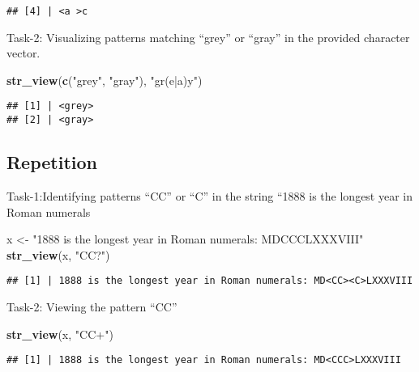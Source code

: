 \documentclass[
]{article}
\newenvironment{Shaded}{\begin{snugshade}}{\end{snugshade}}
\newcommand{\FunctionTok}[1]{\textcolor[rgb]{0.13,0.29,0.53}{\textbf{#1}}}
\newcommand{\NormalTok}[1]{#1}
\newcommand{\OtherTok}[1]{\textcolor[rgb]{0.56,0.35,0.01}{#1}}
\newcommand{\StringTok}[1]{\textcolor[rgb]{0.31,0.60,0.02}{#1}}
\begin{document}
\begin{verbatim}
## [4] | <a >c
\end{verbatim}

Task-2: Visualizing patterns matching ``grey'' or ``gray'' in the
provided character vector.

\begin{Shaded}
\begin{Highlighting}[]
\FunctionTok{str\_view}\NormalTok{(}\FunctionTok{c}\NormalTok{(}\StringTok{"grey"}\NormalTok{, }\StringTok{"gray"}\NormalTok{), }\StringTok{"gr(e|a)y"}\NormalTok{)}
\end{Highlighting}
\end{Shaded}

\begin{verbatim}
## [1] | <grey>
## [2] | <gray>
\end{verbatim}

\hypertarget{repetition}{%
\subsection{Repetition}\label{repetition}}

Task-1:Identifying patterns ``CC'' or ``C'' in the string ``1888 is the
longest year in Roman numerals

\begin{Shaded}
\begin{Highlighting}[]
\NormalTok{x }\OtherTok{\textless{}{-}} \StringTok{"1888 is the longest year in Roman numerals: MDCCCLXXXVIII"}
\FunctionTok{str\_view}\NormalTok{(x, }\StringTok{"CC?"}\NormalTok{)}
\end{Highlighting}
\end{Shaded}

\begin{verbatim}
## [1] | 1888 is the longest year in Roman numerals: MD<CC><C>LXXXVIII
\end{verbatim}

Task-2: Viewing the pattern ``CC''

\begin{Shaded}
\begin{Highlighting}[]
\FunctionTok{str\_view}\NormalTok{(x, }\StringTok{"CC+"}\NormalTok{)}
\end{Highlighting}
\end{Shaded}

\begin{verbatim}
## [1] | 1888 is the longest year in Roman numerals: MD<CCC>LXXXVIII
\end{verbatim}
\end{document}
